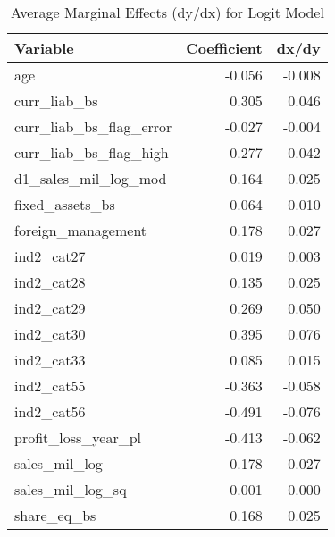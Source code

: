 \begin{table}

\caption{Average Marginal Effects (dy/dx) for Logit Model}
\centering
\begin{tabular}[t]{l|r|r}
\hline
Variable & Coefficient & dx/dy\\
\hline
age & -0.056 & -0.008\\
\hline
curr\_liab\_bs & 0.305 & 0.046\\
\hline
curr\_liab\_bs\_flag\_error & -0.027 & -0.004\\
\hline
curr\_liab\_bs\_flag\_high & -0.277 & -0.042\\
\hline
d1\_sales\_mil\_log\_mod & 0.164 & 0.025\\
\hline
fixed\_assets\_bs & 0.064 & 0.010\\
\hline
foreign\_management & 0.178 & 0.027\\
\hline
ind2\_cat27 & 0.019 & 0.003\\
\hline
ind2\_cat28 & 0.135 & 0.025\\
\hline
ind2\_cat29 & 0.269 & 0.050\\
\hline
ind2\_cat30 & 0.395 & 0.076\\
\hline
ind2\_cat33 & 0.085 & 0.015\\
\hline
ind2\_cat55 & -0.363 & -0.058\\
\hline
ind2\_cat56 & -0.491 & -0.076\\
\hline
profit\_loss\_year\_pl & -0.413 & -0.062\\
\hline
sales\_mil\_log & -0.178 & -0.027\\
\hline
sales\_mil\_log\_sq & 0.001 & 0.000\\
\hline
share\_eq\_bs & 0.168 & 0.025\\
\hline
\end{tabular}
\end{table}